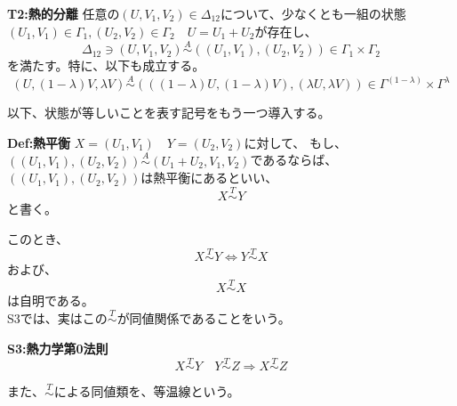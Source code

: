 \documentclass[a4paper,11pt]{jsarticle}
\numberwithin{equation}{section}
\begin{document}
\begin{itembox}[l]{\textbf{T2:熱的分離}}
任意の$(U,V_1,V_2) \in \Delta_{12}$について、少なくとも一組の状態$(U_1,V_1)\in \Gamma_1,(U_2,V_2) \in \Gamma_2\quad U=U_1+U_2$が存在し、
\begin{equation}
    \Delta_{12} \ni (U,V_1,V_2) \overset{A}{\sim}((U_1,V_1),(U_2,V_2))\in \Gamma_1 \times \Gamma_2
\end{equation}
を満たす。特に、以下も成立する。
\begin{equation}
    (U,(1-\lambda)V,\lambda V) \overset{A}{\sim}(((1-\lambda)U,(1-\lambda)V),(\lambda U,\lambda V)) \in \Gamma^{(1-\lambda)} \times \Gamma^{\lambda}
\end{equation}
\end{itembox}
以下、状態が等しいことを表す記号をもう一つ導入する。\\
\begin{itembox}[l]{\textbf{Def:熱平衡}}
$X=(U_1,V_1) \quad Y =(U_2,V_2)$に対して、
もし、$((U_1,V_1),(U_2,V_2)) \overset{A}{\sim} (U_1+U_2,V_1,V_2)$であるならば、$((U_1,V_1),(U_2,V_2))$は熱平衡にあるといい、
\begin{equation}
    X \overset{T}{\sim} Y
\end{equation}
と書く。
\end{itembox}
このとき、
\begin{equation}
    X \overset{T}{\sim} Y \Leftrightarrow Y \overset{T}{\sim} X
\end{equation}
および、
\begin{equation}
    X \overset{T}{\sim} X
\end{equation}
は自明である。\\
S3では、実はこの$\overset{T}{\sim}$が同値関係であることをいう。\\

\begin{itembox}[l]{\textbf{S3:熱力学第0法則}}
    \begin{equation}
        X \overset{T}{\sim} Y \quad Y \overset{T}{\sim} Z \Rightarrow X \overset{T}{\sim} Z
    \end{equation}
\end{itembox}
また、$\overset{T}{\sim}$による同値類を、等温線という。\\
\end{document}
